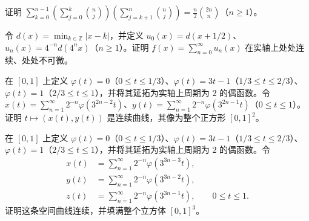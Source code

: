 \noindent\begin{minipage}{\textwidth}
证明 $\displaystyle\sum_{k=0}^{n-1}\left(\sum_{j=0}^k\binom nj\right)\left(\sum_{j=k+1}^n\binom nj\right)=\frac n2\binom{2n}n$（$n\ge1$）。
\end{minipage}\par\vfill
\noindent\begin{minipage}{\textwidth}
令 $d(x)=\min_{k\in\mathbb Z}|x-k|$，并定义 $u_0(x)=d(x+1/2)$、$u_n(x)=4^{-n}d(4^nx)$（$n\ge1$）。证明 $f(x)=\sum_{n=0}^{\infty}u_n(x)$ 在实轴上处处连续、处处不可微。
\end{minipage}\par\vfill
\newpage
\noindent\begin{minipage}{\textwidth}
在 $[0,1]$ 上定义 $\varphi(t)=0$（$0\le t\le1/3$）、$\varphi(t)=3t-1$（$1/3\le t\le2/3$）、$\varphi(t)=1$（$2/3\le t\le1$），并将其延拓为实轴上周期为 $2$ 的偶函数。令 $x(t)=\sum_{n=1}^{\infty}2^{-n}\varphi(3^{2n-2}t)$、$y(t)=\sum_{n=1}^{\infty}2^{-n}\varphi(3^{2n-1}t)$（$0\le t\le1$）。证明 $t\mapsto(x(t),y(t))$ 是连续曲线，其像为整个正方形 $[0,1]^2$。
\end{minipage}\par\vfill
\noindent\begin{minipage}{\textwidth}
在 $[0,1]$ 上定义 $\varphi(t)=0$（$0\le t\le1/3$）、$\varphi(t)=3t-1$（$1/3\le t\le2/3$）、$\varphi(t)=1$（$2/3\le t\le1$），并将其延拓为实轴上周期为 $2$ 的偶函数。令\[\begin{aligned}x(t)&=\sum_{n=1}^{\infty}2^{-n}\varphi(3^{3n-3}t),\\y(t)&=\sum_{n=1}^{\infty}2^{-n}\varphi(3^{3n-2}t),\\z(t)&=\sum_{n=1}^{\infty}2^{-n}\varphi(3^{3n-1}t),\qquad0\le t\le1.\end{aligned}\]证明这条空间曲线连续，并填满整个立方体 $[0,1]^3$。
\end{minipage}\par\vfill
